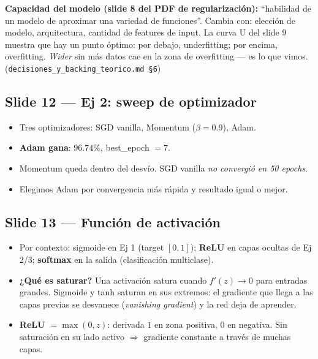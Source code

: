 \documentclass[11pt,a4paper]{article}
\newcommand{\nref}[1]{\textcolor{muted}{\small(\texttt{#1})}}
\begin{document}
\begin{nota}
\textbf{Capacidad del modelo (slide 8 del PDF de regularización):} ``habilidad
de un modelo de aproximar una variedad de funciones''. Cambia con: elección de
modelo, arquitectura, cantidad de features de input. La curva U del slide 9
muestra que hay un punto óptimo: por debajo, underfitting; por encima,
overfitting. \emph{Wider} sin más datos cae en la zona de overfitting — es lo
que vimos. \nref{decisiones\_y\_backing\_teorico.md \S 6}
\end{nota}

\subsection{Slide 12 — Ej 2: sweep de optimizador}

\begin{decir}
\begin{itemize}[leftmargin=*,topsep=0pt]
  \item Tres optimizadores: SGD vanilla, Momentum ($\beta=0.9$), Adam.
  \item \textbf{Adam gana}: $96.74\%$, best\_epoch $= 7$.
  \item Momentum queda dentro del desvío. SGD vanilla \emph{no convergió en 50 epochs}.
  \item Elegimos Adam por convergencia más rápida y resultado igual o mejor.
\end{itemize}
\end{decir}

\subsection{Slide 13 — Función de activación}

\begin{decir}
\begin{itemize}[leftmargin=*,topsep=0pt]
  \item Por contexto: sigmoide en Ej 1 (target $[0,1]$); \textbf{ReLU} en capas
        ocultas de Ej 2/3; \textbf{softmax} en la salida (clasificación multiclase).
  \item \textbf{¿Qué es saturar?} Una activación satura cuando $f'(z) \to 0$
        para entradas grandes. Sigmoide y tanh saturan en sus extremos: el
        gradiente que llega a las capas previas se desvanece (\emph{vanishing
        gradient}) y la red deja de aprender.
  \item \textbf{ReLU $= \max(0, z)$}: derivada $1$ en zona positiva, $0$ en
        negativa. Sin saturación en su lado activo $\Rightarrow$ gradiente
        constante a través de muchas capas.
\end{itemize}
\end{decir}
\end{document}
